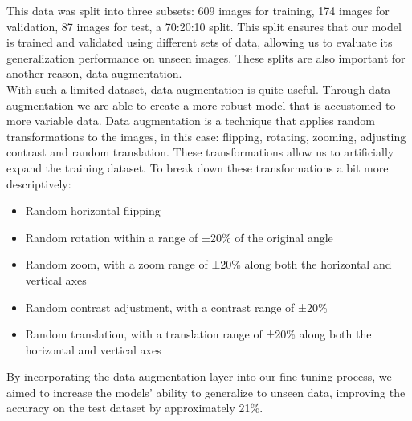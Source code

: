 \documentclass[12pt]{article}
\begin{document}
This data was split into three subsets: 609 images for training, 174 images for validation, 87 images for test, a 70:20:10 split.
This split ensures that our model is trained and validated using different sets of data, allowing us to evaluate its generalization
performance on unseen images. These splits are also important for another reason, data augmentation.\\


With such a limited dataset, data augmentation is quite useful. Through data augmentation we are able to create a more robust model that 
is accustomed to more variable data. Data augmentation is a technique that applies random transformations to the images, in this case:
flipping, rotating, zooming, adjusting contrast and random translation. These transformations allow us to artificially expand the training dataset. 
To break down these transformations a bit more descriptively:
\begin{itemize}
    \item Random horizontal flipping
    \item Random rotation within a range of ±20\% of the original angle
    \item Random zoom, with a zoom range of ±20\% along both the horizontal and vertical axes
    \item Random contrast adjustment, with a contrast range of ±20\%
    \item Random translation, with a translation range of ±20\% along both the horizontal and vertical axes
\end{itemize}

By incorporating the data augmentation layer into our fine-tuning process, we aimed to increase the models' ability to 
generalize to unseen data, improving the accuracy on the test dataset by approximately 21\%. \\
\end{document}
